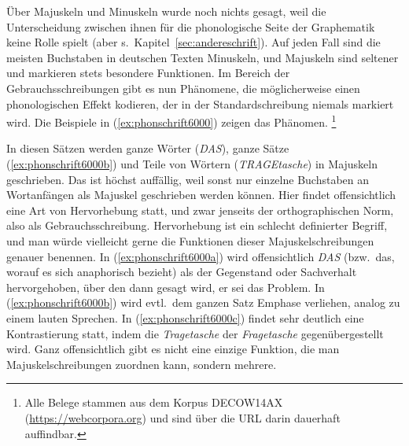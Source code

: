 \label{sec:hervorhebung}

Über Majuskeln und Minuskeln wurde noch nichts gesagt, weil die Unterscheidung zwischen ihnen für die phonologische Seite der Graphematik keine Rolle spielt (aber s.\ Kapitel~\ref{sec:andereschrift}).
Auf jeden Fall sind die meisten Buchstaben in deutschen Texten Minuskeln, und Majuskeln sind seltener und markieren stets besondere Funktionen.
Im Bereich der Gebrauchsschreibungen gibt es nun Phänomene, die möglicherweise einen phonologischen Effekt kodieren, der in der Standardschreibung niemals markiert wird.
Die Beispiele in (\ref{ex:phonschrift6000}) zeigen das Phänomen.%
\footnote{Alle Belege stammen aus dem Korpus DECOW14AX (\url{https://webcorpora.org}) und sind über die URL darin dauerhaft auffindbar.}

\begin{exe}
  \ex\label{ex:phonschrift6000} 
  \begin{xlist}
  \end{xlist}
\end{exe}

In diesen Sätzen werden ganze Wörter (\textit{DAS}), ganze Sätze (\ref{ex:phonschrift6000b}) und Teile von Wörtern (\textit{TRAGEtasche}) in Majuskeln geschrieben.
Das ist höchst auffällig, weil sonst nur einzelne Buchstaben an Wortanfängen als Majuskel geschrieben werden können.
Hier findet offensichtlich eine Art von Hervorhebung statt, und zwar jenseits der orthographischen Norm, also als Gebrauchsschreibung.
Hervorhebung ist ein schlecht definierter Begriff, und man würde vielleicht gerne die Funktionen dieser Majuskelschreibungen genauer benennen.
In (\ref{ex:phonschrift6000a}) wird offensichtlich \textit{DAS} (bzw.\ das, worauf es sich anaphorisch bezieht) als der Gegenstand oder Sachverhalt hervorgehoben, über den dann gesagt wird, er sei das Problem.
In (\ref{ex:phonschrift6000b}) wird evtl.\ dem ganzen Satz Emphase verliehen, analog zu einem lauten Sprechen.
In (\ref{ex:phonschrift6000c}) findet sehr deutlich eine Kontrastierung statt, indem die \textit{Tragetasche} der \textit{Fragetasche} gegenübergestellt wird.
Ganz offensichtlich gibt es nicht eine einzige Funktion, die man Majuskelschreibungen zuordnen kann, sondern mehrere.

